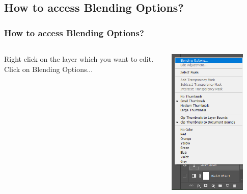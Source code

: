 \documentclass{beamer}
\begin{document}
	\subsection{How to access Blending Options?}
	\begin{frame}
		\frametitle{How to access Blending Options?}
				\begin{columns}
			\vspace{-15pt}
		\begin{outline}
			\1 Right click on the layer which you want to edit.
			\1 Click on Blending Options...
		\end{outline}
		\begin{center}
			\includegraphics[width = 0.8\textwidth]{images/blending options.png}
		\end{center}
	\end{columns}
	\end{frame}
\end{document}
